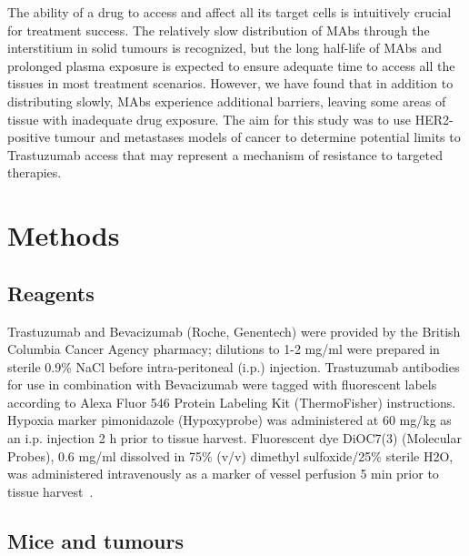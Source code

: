 The ability of a drug to access and affect all its target cells is intuitively crucial for treatment success.
The relatively slow distribution of \acs{MAbs} through the interstitium in solid tumours is recognized, but the long half-life of \acs{MAbs} and prolonged plasma exposure is expected to ensure adequate time to access all the tissues in most treatment scenarios.
However, we have found that in addition to distributing slowly, \acs{MAbs} experience additional barriers, leaving some areas of tissue with inadequate drug exposure.
The aim for this study was to use \acs{HER2}-positive tumour and metastases models of cancer to determine potential limits to Trastuzumab access that may represent a mechanism of resistance to targeted therapies.

\section{Methods}

\subsection{Reagents}

Trastuzumab and Bevacizumab (Roche, Genentech) were provided by the British Columbia Cancer Agency pharmacy; dilutions to 1-2 mg/ml were prepared in sterile 0.9\% NaCl before intra-peritoneal (\acs{i.p.}) injection.
Trastuzumab antibodies for use in combination with Bevacizumab were tagged with fluorescent labels according to Alexa Fluor 546 Protein Labeling Kit (ThermoFisher) instructions.
Hypoxia marker pimonidazole (Hypoxyprobe) was administered at 60 mg/kg as an \acs{i.p.} injection 2 h prior to tissue harvest.
Fluorescent dye DiOC7(3) (Molecular Probes), 0.6 mg/ml dissolved in 75\% (v/v) dimethyl sulfoxide/25\% sterile H2O, was administered intravenously as a marker of vessel perfusion 5 min prior to tissue harvest~\cite{Trotter:1989cs}.

\subsection{Mice and tumours}

